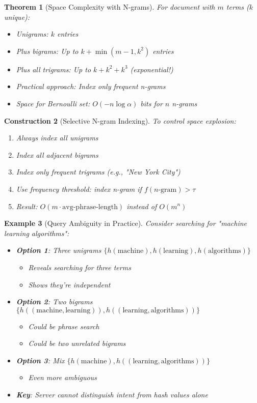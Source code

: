 \documentclass[11pt,final,hidelinks]{article}
\newtheorem{theorem}{Theorem}[section]
\newtheorem{example}[theorem]{Example}
\newtheorem{construction}[theorem]{Construction}
\begin{document}
\begin{theorem}[Space Complexity with N-grams]
For document with $m$ terms ($k$ unique):
\begin{itemize}
    \item Unigrams: $k$ entries
    \item Plus bigrams: Up to $k + \min(m-1, k^2)$ entries
    \item Plus all trigrams: Up to $k + k^2 + k^3$ (exponential!)
    \item Practical approach: Index only frequent n-grams
    \item Space for Bernoulli set: $O(-n \log \alpha)$ bits for $n$ n-grams
\end{itemize}
\end{theorem}

\begin{construction}[Selective N-gram Indexing]
To control space explosion:
\begin{enumerate}
    \item Always index all unigrams
    \item Index all adjacent bigrams
    \item Index only frequent trigrams (e.g., "New York City")
    \item Use frequency threshold: index n-gram if $f(n\text{-gram}) > \tau$
    \item Result: $O(m \cdot \text{avg-phrase-length})$ instead of $O(m^n)$
\end{enumerate}
\end{construction}

\begin{example}[Query Ambiguity in Practice]
Consider searching for "machine learning algorithms":
\begin{itemize}
    \item \textbf{Option 1}: Three unigrams $\{h(\text{machine}), h(\text{learning}), h(\text{algorithms})\}$
        \begin{itemize}
            \item Reveals searching for three terms
            \item Shows they're independent
        \end{itemize}
    \item \textbf{Option 2}: Two bigrams $\{h((\text{machine}, \text{learning})), h((\text{learning}, \text{algorithms}))\}$
        \begin{itemize}
            \item Could be phrase search
            \item Could be two unrelated bigrams
        \end{itemize}
    \item \textbf{Option 3}: Mix $\{h(\text{machine}), h((\text{learning}, \text{algorithms}))\}$
        \begin{itemize}
            \item Even more ambiguous
        \end{itemize}
    \item \textbf{Key}: Server cannot distinguish intent from hash values alone
\end{itemize}
\end{example}
\end{document}
